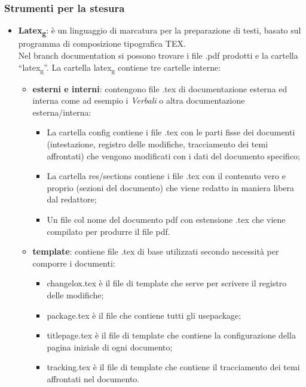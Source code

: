 \subsubsection{Strumenti per la stesura}
\begin{itemize} 
    \item \textbf{Latex\textsubscript{g}}: è un linguaggio di marcatura per la preparazione di testi, basato sul programma di composizione tipografica TEX.\\
	Nel branch documentation  si possono trovare i file .pdf prodotti e la cartella “latex\textsubscript{g}”. La cartella latex\textsubscript{g} contiene tre cartelle interne:
	\begin{itemize}
	\item \textbf{esterni e interni}: contengono file .tex di documentazione esterna ed interna come ad esempio i \textit{Verbali} o altra documentazione esterna/interna:
	\begin{itemize}
		\item La cartella config contiene i file .tex con le parti fisse dei documenti (intestazione, registro delle modifiche, tracciamento dei temi affrontati) che vengono modificati con i dati del documento specifico;
		\item La cartella res/sections contiene i file .tex con il contenuto vero e proprio (sezioni del documento) che viene redatto in maniera libera dal redattore;
		\item Un file col nome del documento pdf con estensione .tex che viene compilato per produrre il file pdf.
	\end{itemize}
	 \item \textbf{template}: contiene file .tex di base utilizzati secondo necessità per comporre i documenti:
	 \begin{itemize}
	 \item changelox.tex è il file di template che serve per scrivere il registro delle modifiche;
	 \item package.tex è il file che contiene tutti gli usepackage;
	 \item titlepage.tex è il file di template che contiene la configurazione della pagina iniziale di ogni documento;  
	 \item tracking.tex è il file di template che contiene il tracciamento dei temi affrontati nel documento.
	 \end{itemize}
	\end{itemize}
\end{itemize}